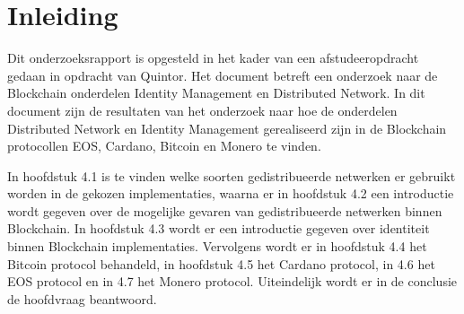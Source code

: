 \newpage
\chapter{Inleiding}

Dit onderzoeksrapport is opgesteld in het kader van een afstudeeropdracht gedaan in opdracht van Quintor. Het document betreft een onderzoek naar de Blockchain onderdelen Identity Management en Distributed Network. In dit document zijn de resultaten van het onderzoek naar hoe de onderdelen Distributed Network en Identity Management gerealiseerd zijn in de Blockchain protocollen EOS, Cardano, Bitcoin en Monero te vinden.

In hoofdstuk 4.1 is te vinden welke soorten gedistribueerde netwerken er gebruikt worden in de gekozen implementaties, waarna er in hoofdstuk 4.2 een introductie wordt gegeven over de mogelijke gevaren van gedistribueerde netwerken binnen Blockchain. In hoofdstuk 4.3 wordt er een introductie gegeven over identiteit binnen Blockchain implementaties. Vervolgens wordt er in hoofdstuk 4.4 het Bitcoin protocol behandeld, in hoofdstuk 4.5 het Cardano protocol, in 4.6 het EOS protocol en in 4.7 het Monero protocol. Uiteindelijk wordt er in de conclusie de hoofdvraag beantwoord.